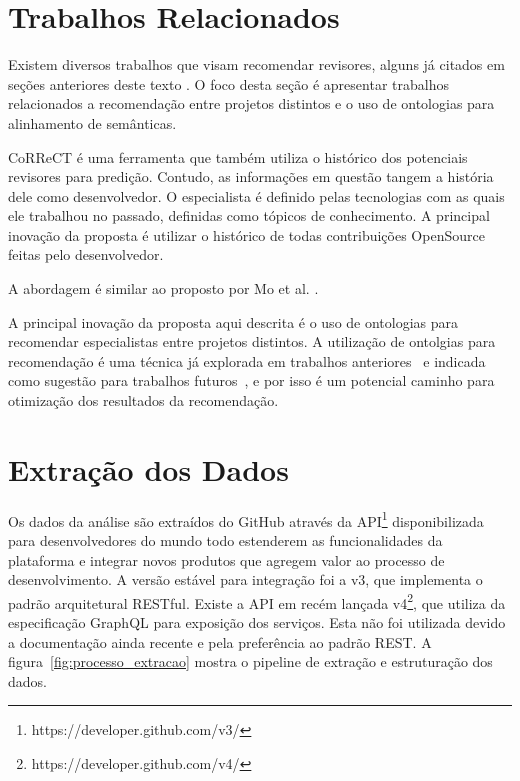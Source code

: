\documentclass[sigconf]{acmart}
\begin{document}
\section{Trabalhos Relacionados}\label{cha:relacionados}

Existem diversos trabalhos que visam recomendar revisores, alguns já citados em seções anteriores deste texto \cite{yu2014,yu2014-2,Xia2015261,jiang2017,fu2017,xia2017,yang2016}. O foco desta seção é apresentar trabalhos relacionados a recomendação entre projetos distintos e o uso de ontologias para alinhamento de semânticas.

CoRReCT \cite{rahman2016} é uma ferramenta que também utiliza o histórico dos potenciais revisores para predição. Contudo, as informações em questão tangem a história dele como desenvolvedor. O especialista é definido pelas tecnologias com as quais ele trabalhou no passado, definidas como tópicos de conhecimento. A principal inovação da proposta é utilizar o histórico de todas contribuições OpenSource feitas pelo desenvolvedor.

A abordagem é similar ao proposto por Mo et al. \cite{mo2015}.

A principal inovação da proposta aqui descrita é o uso de ontologias para recomendar especialistas entre projetos distintos. A utilização de ontolgias para recomendação é uma técnica já explorada em trabalhos anteriores~\cite{middleton2001,middleton2004} e indicada como sugestão para trabalhos futuros~\cite{adomavicius2005}, e por isso é um potencial caminho para otimização dos resultados da recomendação.


\section{Extração dos Dados}

Os dados da análise são extraídos do GitHub através da API\footnote{https://developer.github.com/v3/} disponibilizada para desenvolvedores do mundo todo estenderem as funcionalidades da plataforma e integrar novos produtos que agregem valor ao processo de desenvolvimento. A versão estável para integração foi a v3, que implementa o padrão arquitetural RESTful\cite{fielding2002}. Existe a API em recém lançada v4\footnote{https://developer.github.com/v4/}, que utiliza da especificação GraphQL para exposição dos serviços. Esta não foi utilizada devido a documentação ainda recente e pela preferência ao padrão REST. A figura~\ref{fig:processo_extracao} mostra o pipeline de extração e estruturação dos dados.
\end{document}
